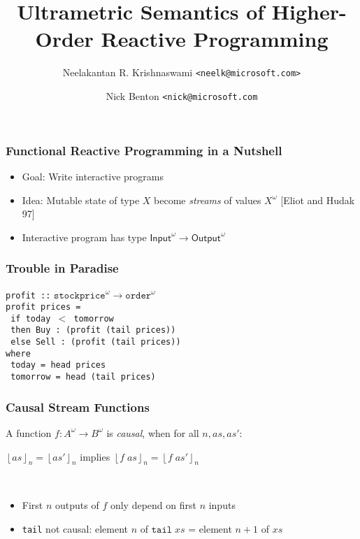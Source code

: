 \documentclass{beamer}
\title{Ultrametric Semantics of Higher-Order Reactive Programming}
\author{Neelakantan R. Krishnaswami \texttt{<neelk@microsoft.com>} \and
        Nick Benton \texttt{<nick@microsoft.com}}
\newcommand{\floor}[1]{\left\lfloor{#1}\right\rfloor}
\begin{document}
\begin{frame}
\maketitle
\end{frame}

\begin{frame}
\frametitle{Functional Reactive Programming in a Nutshell}
\begin{itemize}
\item<+-> Goal: Write interactive programs
\item<+-> Idea: Mutable state of type $X$ become \emph{streams} of values $X^\omega$ [Eliot and Hudak 97]
\item<+-> Interactive program has type $\mathsf{Input}^\omega \to \mathsf{Output}^\omega$
\end{itemize}
\end{frame}

\begin{frame}[fragile]
\frametitle{Trouble in Paradise}
\begin{tabbing}
\texttt{profit ::} $\mathtt{stockprice}^\omega \to \mathtt{order}^\omega$ \\
\texttt{profit prices = } \\
\;\;\= \texttt{  if today $<$ tomorrow} \\
    \> \texttt{  then Buy  : (profit (tail prices))} \\
    \> \texttt{  else Sell : \!\!\!(profit (tail prices))} \\
\texttt{where} \\
    \> \texttt{  today = head prices} \\
    \> \texttt{  tomorrow = \alert<2>{head (tail prices)}} \\
\end{tabbing}
\end{frame}

\begin{frame}
  \frametitle{Causal Stream Functions}

  A function $f : A^\omega \to B^\omega$ is \emph{causal}, when for all $n, as, as'$:

  \begin{center}
    $\floor{as}_n = \floor{as'}_n$ implies $\floor{f\;as}_n = \floor{f\;as'}_n$
  \end{center}

\ \\
\begin{itemize}
\pause \item First $n$ outputs of $f$ only depend on first $n$ inputs
\pause \item \texttt{tail} not causal: element $n$ of $\mathtt{tail}\;xs$
=  element $n+1$ of $xs$
\end{itemize}
\end{frame}
\end{document}
